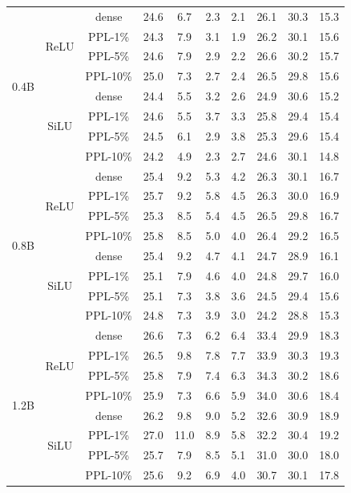 \documentclass{article} %
\begin{document}
\begin{table}[ht]
\begin{center}
\begin{tabular}{c|c|c|ccccccc}
\midrule
\multirow{8}{*}{0.4B} & \multirow{4}{*}{ReLU} 
& dense  & 24.6 & 6.7 & 2.3 & 2.1 & 26.1 & 30.3 & 15.3 \\
& & PPL-1\% & 24.3 & 7.9 & 3.1 & 1.9 & 26.2 & 30.1 & 15.6 \\
& & PPL-5\% & 24.6 & 7.9 & 2.9 & 2.2 & 26.6 & 30.2 & 15.7 \\
& & PPL-10\% & 25.0 & 7.3 & 2.7 & 2.4 & 26.5 & 29.8 & 15.6 \\
\cmidrule{2-10}
& \multirow{4}{*}{SiLU} 
& dense  & 24.4 & 5.5 & 3.2 & 2.6 & 24.9 & 30.6 & 15.2 \\
& & PPL-1\% & 24.6 & 5.5 & 3.7 & 3.3 & 25.8 & 29.4 & 15.4 \\
& & PPL-5\% & 24.5 & 6.1 & 2.9 & 3.8 & 25.3 & 29.6 & 15.4 \\
& & PPL-10\% & 24.2 & 4.9 & 2.3 & 2.7 & 24.6 & 30.1 & 14.8 \\

\midrule
\multirow{8}{*}{0.8B} & \multirow{4}{*}{ReLU} 
& dense  & 25.4 & 9.2 & 5.3 & 4.2 & 26.3 & 30.1 & 16.7 \\
& & PPL-1\% & 25.7 & 9.2 & 5.8 & 4.5 & 26.3 & 30.0 & 16.9 \\
& & PPL-5\% & 25.3 & 8.5 & 5.4 & 4.5 & 26.5 & 29.8 & 16.7 \\
& & PPL-10\% & 25.8 & 8.5 & 5.0 & 4.0 & 26.4 & 29.2 & 16.5 \\
\cmidrule{2-10}
& \multirow{4}{*}{SiLU} 
& dense  & 25.4 & 9.2 & 4.7 & 4.1 & 24.7 & 28.9 & 16.1 \\
& & PPL-1\% & 25.1 & 7.9 & 4.6 & 4.0 & 24.8 & 29.7 & 16.0 \\
& & PPL-5\% & 25.1 & 7.3 & 3.8 & 3.6 & 24.5 & 29.4 & 15.6 \\
& & PPL-10\% & 24.8 & 7.3 & 3.9 & 3.0 & 24.2 & 28.8 & 15.3 \\

\midrule
\multirow{8}{*}{1.2B} & \multirow{4}{*}{ReLU} 
& dense  & 26.6 & 7.3 & 6.2 & 6.4 & 33.4 & 29.9 & 18.3 \\
& & PPL-1\% & 26.5 & 9.8 & 7.8 & 7.7 & 33.9 & 30.3 & 19.3 \\
& & PPL-5\% & 25.8 & 7.9 & 7.4 & 6.3 & 34.3 & 30.2 & 18.6 \\
& & PPL-10\% & 25.9 & 7.3 & 6.6 & 5.9 & 34.0 & 30.6 & 18.4 \\

\cmidrule{2-10}
& \multirow{4}{*}{SiLU} 
& dense  & 26.2 & 9.8 & 9.0 & 5.2 & 32.6 & 30.9 & 18.9 \\
& & PPL-1\% & 27.0 & 11.0 & 8.9 & 5.8 & 32.2 & 30.4 & 19.2 \\
& & PPL-5\% & 25.7 & 7.9 & 8.5 & 5.1 & 31.0 & 30.0 & 18.0 \\
& & PPL-10\% & 25.6 & 9.2 & 6.9 & 4.0 & 30.7 & 30.1 & 17.8 \\

\bottomrule
\end{tabular}
\end{center}
\end{table}
\end{document}
